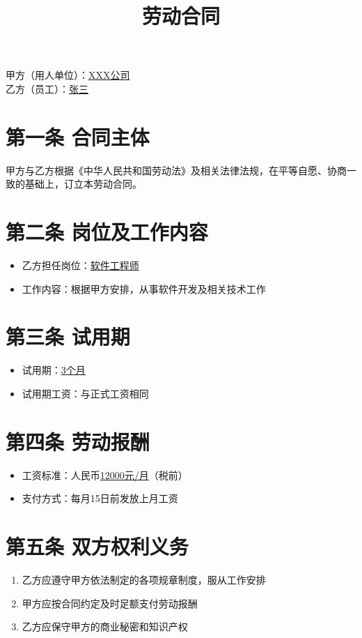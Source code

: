 \documentclass[UTF8]{ctexart}
\title{劳动合同}
\author{}
\date{}
\begin{document}
\maketitle

\noindent 甲方（用人单位）：\underline{XXX公司} \\
乙方（员工）：\underline{张三}

\section*{第一条 合同主体}
甲方与乙方根据《中华人民共和国劳动法》及相关法律法规，在平等自愿、协商一致的基础上，订立本劳动合同。

\section*{第二条 岗位及工作内容}
\begin{itemize}
    \item 乙方担任岗位：\underline{软件工程师}
    \item 工作内容：根据甲方安排，从事软件开发及相关技术工作
\end{itemize}

\section*{第三条 试用期}
\begin{itemize}
    \item 试用期：\underline{3个月}
    \item 试用期工资：与正式工资相同
\end{itemize}

\section*{第四条 劳动报酬}
\begin{itemize}
    \item 工资标准：人民币\underline{12000元/月}（税前）
    \item 支付方式：每月15日前发放上月工资
\end{itemize}

\section*{第五条 双方权利义务}
\begin{enumerate}
    \item 乙方应遵守甲方依法制定的各项规章制度，服从工作安排
    \item 甲方应按合同约定及时足额支付劳动报酬
    \item 乙方应保守甲方的商业秘密和知识产权
\end{enumerate}
\end{document}
